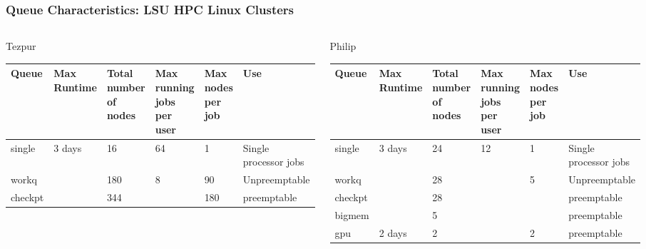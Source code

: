 \documentclass[slidestop,mathserif,compress,xcolor=svgnames,table]{beamer}
\newenvironment{bblock}[0]
{
\begin{beamerboxesrounded}[upper=uppercol1,lower=lowercol1,shadow=true]}
{\end{beamerboxesrounded}}
\begin{document}
\begin{frame}
\frametitle{\small Queue Characteristics: LSU HPC Linux Clusters}
\begin{columns}
\column{12cm}
\begin{bblock}{Tezpur}
{\scriptsize
\begin{center}
\begin{tabular}{|m{}|m{}|m{}|m{}|m{}|m{}|}
\hline
Queue & Max Runtime & Total number of nodes & Max running jobs per user & Max nodes per job & Use \\
\hline
single & \multirow{3}{*}{3 days} & 16 & 64 & 1 & Single processor jobs \\
\cline{1-1}\cline{3-6}
workq &  & 180 & \multirow{2}{*}{8} & 90 & Unpreemptable \\
\cline{1-1}\cline{3-3}\cline{5-6}
checkpt & & 344 & & 180 & preemptable\\
\hline 
\end{tabular}
\end{center}
}
\end{bblock}
\vspace{0.25cm}
\begin{bblock}{Philip}
{\scriptsize
\begin{center}
\begin{tabular}{|m{}|m{}|m{}|m{}|m{}|m{}|}
\hline
Queue & Max Runtime & Total number of nodes & Max running jobs per user & Max nodes per job & Use \\
\hline
single & \multirow{4}{*}{3 days} & 24 & \multirow{5}{*}{12} & 1 & Single processor jobs \\
\cline{1-1}\cline{3-3}\cline{5-6}
workq &  & 28 &  & \multirow{3}{*}{5} & Unpreemptable \\
\cline{1-1}\cline{3-3}\cline{6-6}
checkpt & & 28 & &  & preemptable\\
\cline{1-1}\cline{3-3}\cline{6-6}
bigmem & & 5 & & & preemptable \\
\cline{1-3}\cline{5-6} 
gpu & 2 days & 2 & & 2 & preemptable \\\hline
\end{tabular}
\end{center}
}
\end{bblock}
\end{columns}
\end{frame}
\end{document}
